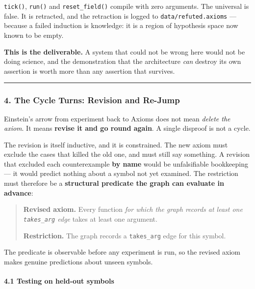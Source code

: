 \documentclass[
  11pt,
  a4paper,
]{article}
\begin{document}
\texttt{tick()}, \texttt{run()} and \texttt{reset\_field()} compile with
zero arguments. The universal is false. It is retracted, and the
retraction is logged to \texttt{data/refuted.axioms} --- because a
failed induction is knowledge: it is a region of hypothesis space now
known to be empty.

\textbf{This is the deliverable.} A system that could not be wrong here
would not be doing science, and the demonstration that the architecture
\emph{can} destroy its own assertion is worth more than any assertion
that survives.

\begin{center}\rule{0.5\linewidth}{0.5pt}\end{center}

\subsubsection{4. The Cycle Turns: Revision and
Re-Jump}\label{the-cycle-turns-revision-and-re-jump}

Einstein's arrow from experiment back to Axioms does not mean
\emph{delete the axiom}. It means \textbf{revise it and go round again}.
A single disproof is not a cycle.

The revision is itself inductive, and it is constrained. The new axiom
must exclude the cases that killed the old one, and must still say
something. A revision that excluded each counterexample \textbf{by name}
would be unfalsifiable bookkeeping --- it would predict nothing about a
symbol not yet examined. The restriction must therefore be a
\textbf{structural predicate the graph can evaluate in advance}:

\begin{quote}
\textbf{Revised axiom.} Every function \emph{for which the graph records
at least one \texttt{takes\_arg} edge} takes at least one argument.

\textbf{Restriction.} The graph records a \texttt{takes\_arg} edge for
this symbol.
\end{quote}

The predicate is observable before any experiment is run, so the revised
axiom makes genuine predictions about unseen symbols.

\paragraph{4.1 Testing on held-out
symbols}\label{testing-on-held-out-symbols}
\end{document}
